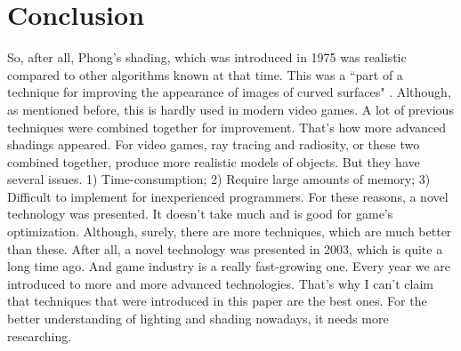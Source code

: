 \documentclass{scrartcl}
\begin{document}
\section{Conclusion}
So, after all, Phong's shading, which was introduced in 1975 \cite{phong1975illumination} was realistic compared to other algorithms known at that time.
This was a ``part of a technique for improving the appearance of images of curved surfaces" \cite[p.~192]{blinn1977models}.
Although, as mentioned before, this is hardly used in modern video games.
A lot of previous techniques were combined together for improvement.
That's how more advanced shadings appeared.
For video games, ray tracing and radiosity, or these two combined together, produce more realistic models of objects.
But they have several issues.
1) Time-consumption; 2) Require large amounts of memory; 3) Difficult to implement for inexperienced programmers.
For these reasons, a novel technology was presented.
It doesn't take much and is good for game's optimization.
Although, surely, there are more techniques, which are much better than these.
After all, a novel technology was presented in 2003, which is quite a long time ago.
And game industry is a really fast-growing one.
Every year we are introduced to more and more advanced technologies.
That's why I can't claim that techniques that were introduced in this paper are the best ones.
For the better understanding of lighting and shading nowadays, it needs more researching.

\newpage{}



\end{document}
